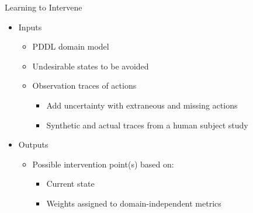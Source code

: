 \begin{frame}{Learning to Intervene}
	\begin{itemize}
		\item Inputs
		\begin{itemize}
			\item PDDL domain model
			\item Undesirable states to be avoided
			\item Observation traces of actions
			\begin{itemize}
				\item Add uncertainty with extraneous and missing actions
				\item Synthetic and actual traces from a human subject study
			\end{itemize}
		\end{itemize}
		\item Outputs
		\begin{itemize}
			\item Possible intervention point(s) based on:
			\begin{itemize}
				\item Current state
				\item Weights assigned to domain-independent metrics
			\end{itemize}
		\end{itemize}
	\end{itemize}
\end{frame}
